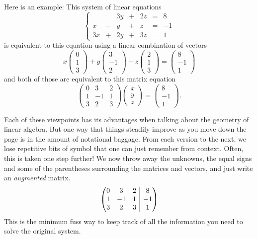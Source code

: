 \documentclass[10pt,]{book}
\makeatletter
\theoremstyle{plain}
\numberwithin{equation}{section}
\newcommand{\augmatrix}[2]{\left(\begin{array}{@{}#1 |c@{}} #2 \end{array}\right)}
\makeatother
\begin{document}
        Here is an example: This system of linear equations
        \[
          \left\{ \begin{array}{rrrrrrr}
              &  &3y &+ &2z &= &8 \\
            x &- & y &+ & z &= &-1 \\
          3 x &+ &2y &+ &3z &= &1
          \end{array}\right.
        \]
        is equivalent to this equation using a linear combination of vectors
        \[
        x \begin{pmatrix} 0 \\ 1 \\ 3 \end{pmatrix} +
        y \begin{pmatrix} 3 \\ -1 \\ 2 \end{pmatrix} +
        z \begin{pmatrix} 2 \\ 1 \\ 3 \end{pmatrix} =
        \begin{pmatrix} 8 \\ -1 \\ 1 \end{pmatrix}
        \]
        and both of those are equivalent to this matrix equation
        \[
          \begin{pmatrix} 0 &3 &2 \\ 1 &-1 &1 \\ 3 &2 &3
          \end{pmatrix} \begin{pmatrix} x \\ y \\ z \end{pmatrix} =
          \begin{pmatrix} 8 \\ -1 \\ 1 \end{pmatrix} .
        \]
\par

        Each of these viewpoints has its advantages when talking about the
        geometry of linear algebra. But one way that things steadily improve as
        you move down the page is in the amount of notational baggage.
        From each version to the next, we lose repetitive bits of symbol that
        one can just remember from context.
        Often, this is taken one step further! We now throw away the unknowns,
        the equal signs and some of the parentheses surrounding the matrices and
        vectors, and just write an \emph{augmented} matrix.
        \[
          \augmatrix{ccc}{
          0 &3 &2 &8\\ 1 &-1 &1 &-1\\ 3 &2 &3 &1
          }
        \]
        This is the minimum fuss way to keep track of all the information you
        need to solve the original system.
\typeout{************************************************}
\typeout{************************************************}
\end{document}
